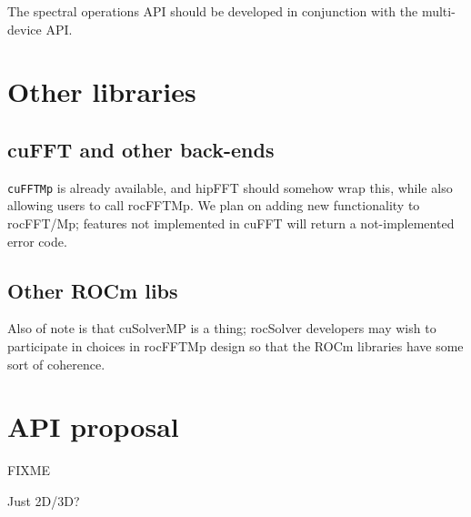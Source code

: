 \documentclass[12pt]{article}
\renewcommand{\(}{\left(}
\renewcommand{\)}{\right)}
\begin{document}
The spectral operations API should be developed in conjunction
with the multi-device API.

\section{Other libraries}

\subsection{cuFFT and other back-ends}

\texttt{cuFFTMp} is already available, and hipFFT should somehow wrap
this, while also allowing users to call rocFFTMp.  We plan on adding
new functionality to rocFFT/Mp; features not implemented in cuFFT will
return a not-implemented error code.


\subsection{Other ROCm libs}

Also of note is that cuSolverMP is a thing; rocSolver developers may
wish to participate in choices in rocFFTMp design so that the ROCm libraries
have some sort of coherence.

\section{API proposal}

FIXME

Just 2D/3D?


\end{document}
